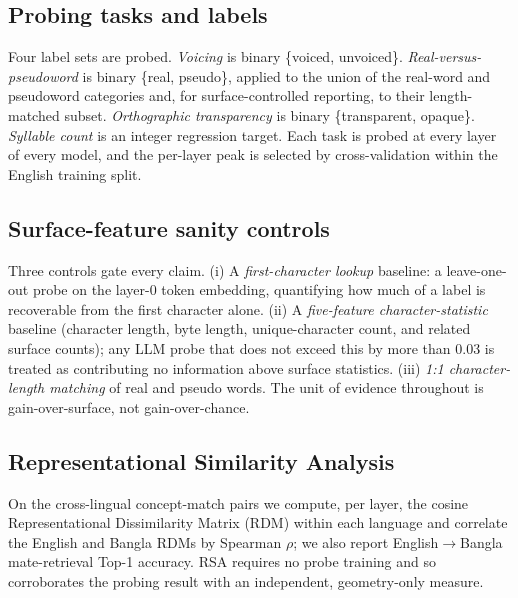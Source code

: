 \documentclass[preprint,12pt]{elsarticle}
\begin{document}
\subsection{Probing tasks and labels}
Four label sets are probed. \emph{Voicing} is binary \{voiced, unvoiced\}. \emph{Real-versus-pseudoword} is binary \{real, pseudo\}, applied to the union of the real-word and pseudoword categories and, for surface-controlled reporting, to their length-matched subset. \emph{Orthographic transparency} is binary \{transparent, opaque\}. \emph{Syllable count} is an integer regression target. Each task is probed at every layer of every model, and the per-layer peak is selected by cross-validation within the English training split.

\subsection{Surface-feature sanity controls}
Three controls gate every claim. (i) A \emph{first-character lookup} baseline: a leave-one-out probe on the layer-0 token embedding, quantifying how much of a label is recoverable from the first character alone. (ii) A \emph{five-feature character-statistic} baseline (character length, byte length, unique-character count, and related surface counts); any LLM probe that does not exceed this by more than 0.03 is treated as contributing no information above surface statistics. (iii) \emph{1:1 character-length matching} of real and pseudo words. The unit of evidence throughout is gain-over-surface, not gain-over-chance.

\subsection{Representational Similarity Analysis}
On the cross-lingual concept-match pairs we compute, per layer, the cosine Representational Dissimilarity Matrix (RDM) \cite{kriegeskorte2008rsa} within each language and correlate the English and Bangla RDMs by Spearman $\rho$; we also report English$\to$Bangla mate-retrieval Top-1 accuracy. RSA requires no probe training and so corroborates the probing result with an independent, geometry-only measure.
\end{document}
